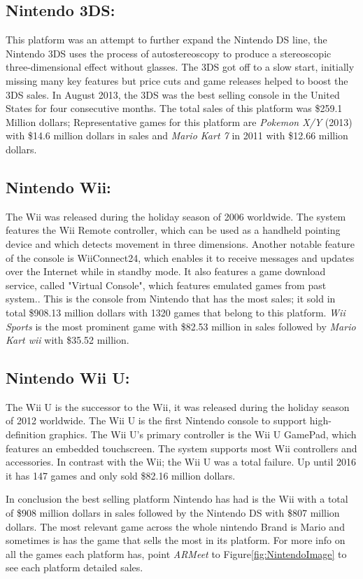 \subsection{Nintendo 3DS:} This platform was an attempt to further expand the
Nintendo DS line, the Nintendo 3DS uses the process of autostereoscopy to
produce a stereoscopic three-dimensional effect without glasses. The 3DS got
off to a slow start, initially missing many key features but price cuts and
game releases helped to boost the 3DS sales. In August 2013, the 3DS was the
best selling console in the United States for four consecutive
months. The total sales of this platform was \$259.1 Million dollars;
Representative games for this platform are \textit{Pokemon X/Y} (2013) with
\$14.6 million dollars in sales and \textit{Mario Kart 7} in 2011 with
\$12.66 million dollars.\\
\subsection{Nintendo Wii:} The Wii was released during the holiday season of
2006 worldwide. The system features the Wii Remote controller, which can be
used as a handheld pointing device and which detects movement in three
dimensions. Another notable feature of the console is WiiConnect24, which
enables it to receive messages and updates over the Internet while in standby
mode. It also features a game download service, called "Virtual Console",
which features emulated games from past system.\cite{Nintendo}. This is the
console from Nintendo that has the most sales; it sold in total \$908.13
million dollars with 1320 games that belong to this platform. \textit{Wii Sports} is
the most prominent game with \$82.53 million in sales followed by \textit{Mario
  Kart wii} with \$35.52 million.\\
\subsection{Nintendo Wii U:} The Wii U is the successor to the Wii, it was
released during the holiday season of 2012 worldwide. The Wii U is
the first Nintendo console to support high-definition graphics. The Wii U's
primary controller is the Wii U GamePad, which features an embedded
touchscreen. The system supports most Wii controllers and
accessories\cite{Nintendo}. In contrast with the Wii; the Wii U was a total
failure. Up until 2016 it has 147 games and only sold \$82.16 million dollars.\newpage

In conclusion the best selling platform Nintendo has had is the Wii with a
total of \$908 million dollars in sales followed by the Nintendo DS with \$807
million dollars. The most relevant game across the whole nintendo Brand is
Mario and sometimes is has the game that sells the most in its platform. For
more info on all the games each platform has, point \textit{ARMeet} to
Figure\ref{fig:NintendoImage} to see each platform detailed sales.\\

